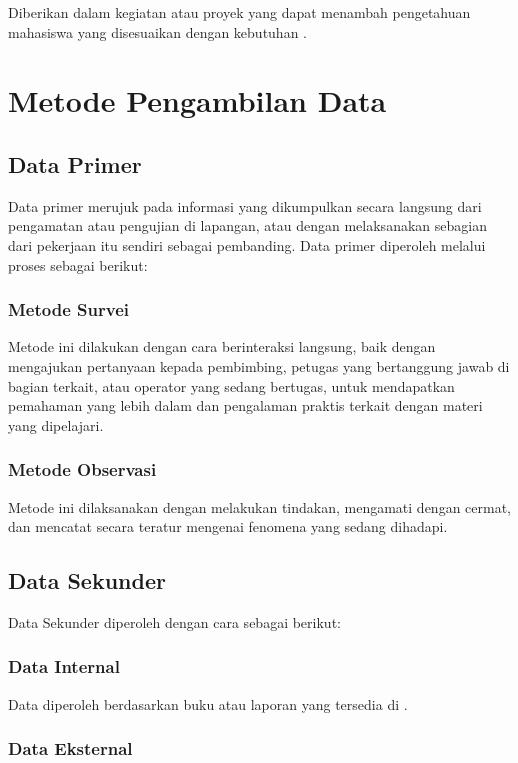 Diberikan dalam kegiatan atau proyek yang dapat menambah pengetahuan mahasiswa yang disesuaikan dengan kebutuhan {\perusahaan}.

\section{Metode Pengambilan Data}

\subsection{Data Primer}

Data primer merujuk pada informasi yang dikumpulkan secara langsung dari pengamatan atau pengujian di lapangan, atau dengan melaksanakan sebagian dari pekerjaan itu sendiri sebagai pembanding. Data primer diperoleh melalui proses sebagai berikut:

\subsubsection{Metode Survei}

Metode ini dilakukan dengan cara berinteraksi langsung, baik dengan mengajukan pertanyaan kepada pembimbing, petugas yang bertanggung jawab di bagian terkait, atau operator yang sedang bertugas, untuk mendapatkan pemahaman yang lebih dalam dan pengalaman praktis terkait dengan materi yang dipelajari.

\subsubsection{Metode Observasi}

Metode ini dilaksanakan dengan melakukan tindakan, mengamati dengan cermat, dan mencatat secara teratur mengenai fenomena yang sedang dihadapi.


\subsection{Data Sekunder}

Data Sekunder diperoleh dengan cara sebagai berikut:

\subsubsection{Data Internal}

Data diperoleh berdasarkan buku atau laporan yang tersedia di {\perusahaan}.

\subsubsection{Data Eksternal}

